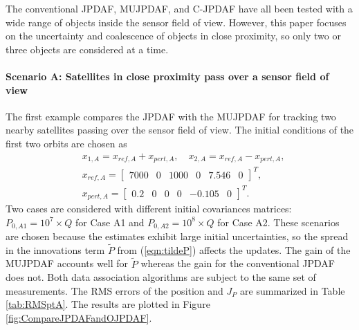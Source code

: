 \documentclass[letterpaper, 10pt, conference]{ieeeconf}
\newcommand{\refeqn}[1]{(\ref{eqn:#1})}
\begin{document}
The conventional JPDAF, MUJPDAF, and C-JPDAF have all been tested with a wide range of objects inside the sensor field of view.
However, this paper focuses on the uncertainty and coalescence of objects in close proximity, so only two or three objects are considered at a time.

\paragraph*{Scenario A: Satellites in close proximity pass over a sensor field of view}
The first example compares the JPDAF with the MUJPDAF for tracking two nearby satellites passing over the sensor field of view. The initial conditions of the first two orbits are chosen as
\begin{align}
&x_{1,A}=x_{ref,A}+x_{pert,A}, \quad x_{2,A}=x_{ref,A}-x_{pert,A},\nonumber
\\
&x_{ref,A}=\begin{bmatrix}7000 & 0 & 1000 & 0 & 7.546 & 0\end{bmatrix}^T,\nonumber
\\
&x_{pert,A}=\begin{bmatrix}
0.2 & 0 & 0 & 0 & -0.105 & 0
\end{bmatrix}^T.
\end{align}
Two cases are considered with different initial covariances matrices: $P_{0,A1}=10^7\times Q$ for Case A1 and $P_{0,A2}=10^8\times Q$ for Case A2.
These scenarios are chosen because the estimates exhibit large initial uncertainties, so the spread in the innovations term $\tilde P$ from \refeqn{tildeP} affects the updates.
The gain of the MUJPDAF accounts well for $\tilde P$ whereas the gain for the conventional JPDAF does not.
Both data association algorithms are subject to the same set of measurements.
The RMS errors of the position and $J_P$ are summarized in Table \ref{tab:RMSptA}.
The results are plotted in Figure \ref{fig:CompareJPDAFandOJPDAF}.
\end{document}
